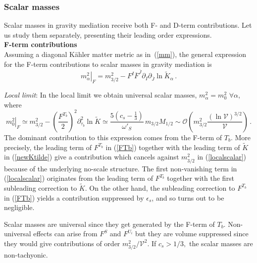 \documentclass[11pt,a4paper]{article}
\newcommand{\be}{\begin{equation}}
\newcommand{\ee}{\end{equation}}
\newcommand\vo{{\mathcal{V}}}
\newcommand{\mc}{\mathcal}
\begin{document}
\subsubsection{Scalar masses}
\label{scalarsection}

Scalar masses in gravity mediation receive both F- and D-term contributions. Let us study them separately, presenting their leading order expressions.\\

\noindent \textbf{F-term contributions}
\medskip\\
Assuming a diagonal K\"ahler matter metric as in~(\ref{mm}), the general expression for the F-term contributions to scalar masses in gravity mediation is \cite{Brignole:1993dj}
\be
\label{genscalF}
\left.m_\alpha^2\right|_F = m_{3/2}^2 - F^I \overline{F}^{\overline{J}} \partial_I \partial_{\overline{J}} \ln \tilde{K}_\alpha\,.
\ee

\emph{Local limit}: In the local limit we obtain universal scalar masses, $m_\alpha^2=m_0^2$ $\forall \alpha$, where
\be
\left.m_0^2\right|_F \simeq m_{3/2}^2 - \left(\frac{F^{T_b}}{2}\right)^2 \partial^2_{\tau_b} \ln\tilde{K}
\simeq \frac{5\left(c_s-\frac 13\right)}{\omega'_S}\, m_{3/2}M_{1/2}\sim \mc{O}\left(m_{3/2}^2\frac{\left(\ln\vo\right)^{3/2}}{\vo}\right)\,.
\label{localscalar}
\ee
The dominant contribution to this expression comes from the F-term of $T_b$.
More precisely, the leading term of $F^{T_b}$ in (\ref{FTb}) together with the leading term of $\tilde{K}$ in (\ref{newKtilde})
give a contribution which cancels against $m_{3/2}^2$ in (\ref{localscalar}) because of the underlying no-scale structure.
The first non-vanishing term in (\ref{localscalar}) originates from the leading term of $F^{T_b}$
together with the first subleading correction to $\tilde{K}$. On the other hand, the subleading correction to $F^{T_b}$ in (\ref{FTb}) yields a contribution
suppressed by $\epsilon_s$, and so turns out to be negligible.

Scalar masses are universal since they get generated by the F-term of $T_b$. Non-universal effects
can arise from $F^S$ and $F^{U_i}$ but they are volume suppressed since they would give contributions of order $m_{3/2}^2/\vo^2$. If $c_s>1/3,$ the scalar masses are non-tachyonic.
\end{document}
